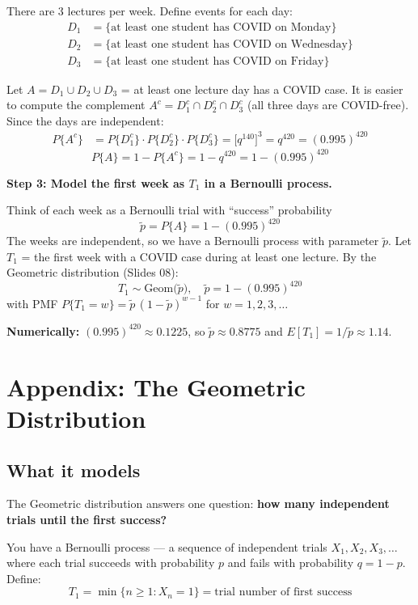 \documentclass[12pt]{article}
\begin{document}
There are 3 lectures per week. Define events for each day:
\begin{align*}
    D_1 &= \{\text{at least one student has COVID on Monday}\} \\
    D_2 &= \{\text{at least one student has COVID on Wednesday}\} \\
    D_3 &= \{\text{at least one student has COVID on Friday}\}
\end{align*}

Let $A = D_1 \cup D_2 \cup D_3$ = at least one lecture day has a COVID case. It is easier to compute the complement $A^c = D_1^c \cap D_2^c \cap D_3^c$ (all three days are COVID-free). Since the days are independent:
\begin{align*}
    P\{A^c\} &= P\{D_1^c\} \cdot P\{D_2^c\} \cdot P\{D_3^c\} = \bigl[q^{140}\bigr]^3 = q^{420} = (0.995)^{420}
\end{align*}
\[
    P\{A\} = 1 - P\{A^c\} = 1 - q^{420} = 1 - (0.995)^{420}
\]

\textbf{Step 3: Model the first week as $T_1$ in a Bernoulli process.}

Think of each week as a Bernoulli trial with ``success'' probability
\[
    \tilde{p} = P\{A\} = 1 - (0.995)^{420}
\]
The weeks are independent, so we have a Bernoulli process with parameter $\tilde{p}$. Let $T_1$ = the first week with a COVID case during at least one lecture. By the Geometric distribution (Slides 08):
\[
    \boxed{T_1 \sim \text{Geom}\bigl(\tilde{p}\bigr), \quad \tilde{p} = 1 - (0.995)^{420}}
\]
with PMF $P\{T_1 = w\} = \tilde{p}\,(1 - \tilde{p})^{w-1}$ for $w = 1, 2, 3, \ldots$

\textbf{Numerically:} $(0.995)^{420} \approx 0.1225$, so $\tilde{p} \approx 0.8775$ and $E[T_1] = 1/\tilde{p} \approx 1.14$.

\newpage
\section*{Appendix: The Geometric Distribution}

\subsection*{What it models}

The Geometric distribution answers one question: \textbf{how many independent trials until the first success?}

You have a Bernoulli process --- a sequence of independent trials $X_1, X_2, X_3, \ldots$ where each trial succeeds with probability $p$ and fails with probability $q = 1 - p$. Define:
\[
    T_1 = \min\{n \geq 1 : X_n = 1\} = \text{trial number of first success}
\]
\end{document}
